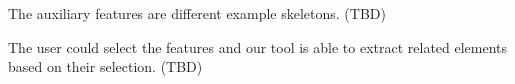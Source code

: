     The auxiliary features are different example  skeletons.  (TBD)

    The user could select the features and our tool is able to extract related elements based on their selection. (TBD)


%
%
%
%
